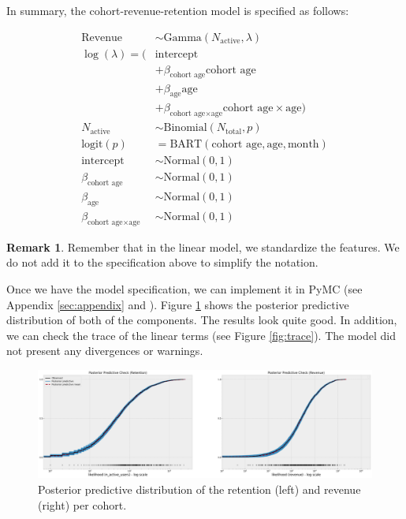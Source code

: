 \documentclass[11pt]{amsart}
\theoremstyle{definition}
\newtheorem{remark}{Remark}
\begin{document}
In summary, the cohort-revenue-retention model is specified as follows:

\begin{align*}
    \text{Revenue} & \sim \text{Gamma}(N_{\text{active}}, \lambda) \\
    \log(\lambda) = (& \text{intercept} \\
        & + \beta_{\text{cohort age}} \text{cohort age} \\
        & + \beta_{\text{age}} \text{age} \\
        & + \beta_{\text{cohort age} \times \text{age}} \text{cohort age} \times \text{age}) \\
    N_{\text{active}} & \sim \text{Binomial}(N_{\text{total}}, p) \\
    \textrm{logit}(p) & = \text{BART}(\text{cohort age}, \text{age}, \text{month}) \\
    \text{intercept} & \sim \text{Normal}(0, 1) \\
    \beta_{\text{cohort age}} & \sim \text{Normal}(0, 1) \\
    \beta_{\text{age}} & \sim \text{Normal}(0, 1) \\
    \beta_{\text{cohort age} \times \text{age}} & \sim \text{Normal}(0, 1)
\end{align*}

\begin{remark}
Remember that in the linear model, we standardize the features. We do not add it to the 
specification above to simplify the notation.
\end{remark}

Once we have the model specification, we can implement it in PyMC (see 
Appendix \ref{sec:appendix} and \cite{orduz_revenue_retention}). Figure
\ref{fig:posterior_predictive} shows the posterior predictive distribution of both
of the components. The results look quite good. In addition, we can check the trace of
the linear terms (see Figure \ref{fig:trace}). The model did not present any
divergences or warnings. 

\begin{figure}
    \centering
    \includegraphics[width=\textwidth]{images/revenue_retention_37_0.png}
    \caption{Posterior predictive distribution of the retention (left) and revenue
    (right) per cohort.}
    \label{fig:posterior_predictive}
\end{figure}
\end{document}
